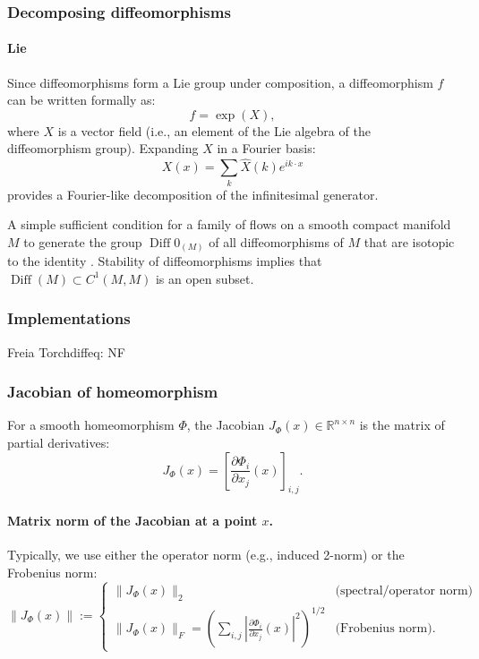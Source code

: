 \documentclass{article}
\theoremstyle{definition} \newtheorem{definition}{Definition}  \newtheorem{example}{Example}
\theoremstyle{remark} \newtheorem{remark}{Remark}
\newcounter{ct}
\newcommand{\Diff}{\operatorname{Diff}}
\begin{document}



\subsubsection{Decomposing diffeomorphisms}\label{sec:diff_dec}
\paragraph{Lie}
Since diffeomorphisms form a Lie group under composition, a diffeomorphism 
\( f \) can be written formally as:
\[
f = \exp(X),
\]
where \( X \) is a vector field (i.e., an element of the Lie algebra of the diffeomorphism group).
Expanding \( X \) in a Fourier basis:
\[
X(x) = \sum_k \hat{X}(k) e^{i k \cdot x}
\]
provides a Fourier-like decomposition of the infinitesimal generator.

A simple sufficient condition for a family of flows on a smooth compact manifold $M$ to generate the group $\Diff0_(M)$ of all diffeomorphisms of $M$ that are isotopic to the identity \citep{caponigro2010families}.
%
Stability of diffeomorphisms implies that $\Diff(M)\subset C^1(M,M)$  is an open subset.


\subsubsection{Implementations}
Freia\citep{freia} %
Torchdiffeq: \citep{torchdiffeq}
NF\citep{dinh2016density} %
\citep{stimper2023normflows} %



\subsubsection{Jacobian of homeomorphism}
 For a smooth homeomorphism \( \Phi \), the Jacobian \( J_{\Phi}(x) \in \mathbb{R}^{n \times n} \) is the matrix of partial derivatives:
\[
J_{\Phi}(x) = \left[ \frac{\partial \Phi_i}{\partial x_j}(x) \right]_{i,j}.
\]

\paragraph{Matrix norm of the Jacobian at a point \( x \).} Typically, we use either the operator norm (e.g., induced 2-norm) or the Frobenius norm:
\[
\|J_{\Phi}(x)\| :=
\begin{cases}
\|J_{\Phi}(x)\|_2 & \text{(spectral/operator norm)} \\
\|J_{\Phi}(x)\|_F = \left( \sum_{i,j} \left| \frac{\partial \Phi_i}{\partial x_j}(x) \right|^2 \right)^{1/2} & \text{(Frobenius norm)}.
\end{cases}
\]
\end{document}
